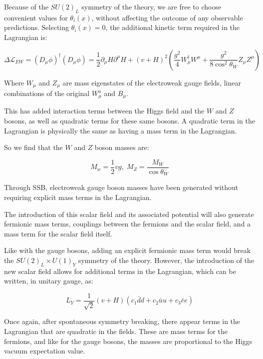 Because of the $SU(2)_L$ symmetry of the theory, we are free to choose convenient values for $\theta_i(x)$,
without affecting the outcome of any observable predictions.
Selecting $\theta_i(x) = 0$, the additional kinetic term required in the Lagrangian is:

\begin{equation}\label{eq:higgs_kinetic}
    \Delta\mathcal{L}_{EW} = \left(D_{\mu}\phi\right)^{\dagger}\left(D_{\mu}\phi\right)
    =\frac{1}{2}\partial_{\mu}H \partial^{\mu}H + (v+H)^{2}\left(\frac{g^2}{4}W_\mu^\dagger W^\mu
    + \frac{g^2}{8\cos^2 {\theta_W}}Z_\mu Z^\mu\right)
\end{equation}

Where $W_\mu$ and $Z_\mu$ are mass eigenstates of the electroweak gauge fields,
linear combinations of the original $W_\mu^a$ and $B_\mu$.

This has added interaction terms between the Higgs field and the $W$ and $Z$ bosons,
as well as quadratic terms for these same bosons.
A quadratic term in the Lagrangian is physically the same as having a mass term in the Lagrangian.

So we find that the $W$ and $Z$ boson masses are:

\begin{equation}\label{eq:wz_masses}
    M_w = \frac{1}{2}vg,\; M_Z = \frac{M_W}{\cos{\theta_W}}
\end{equation}

Through SSB, electroweak gauge boson masses have been generated without requiring explicit mass terms in the Lagrangian.

The introduction of this scalar field and its associated potential will also generate fermionic mass terms,
couplings between the fermions and the scalar field, and a mass term for the scalar field itself.

Like with the gauge bosons, adding an explicit fermionic mass term would break the $SU(2)_L \times U(1)_Y$ symmetry of the theory.
However, the introduction of the new scalar field allows for additional terms in the Lagrangian,
which can be written, in unitary gauge, as:

\begin{equation}\label{ew:yukawa_lagrangian}
    L_Y = \frac{1}{\sqrt{2}}\left(v+H\right)\left(c_{1}\bar{d}d+c_2\bar{u}u+c_3\bar{e}e\right)
\end{equation}

Once again, after spontaneous symmetry breaking, there appear terms in the Lagrangian that are quadratic in the fields.
These are mass terms for the fermions, and like for the gauge bosons, the masses are proportional to the Higgs vacuum
expectation value.

